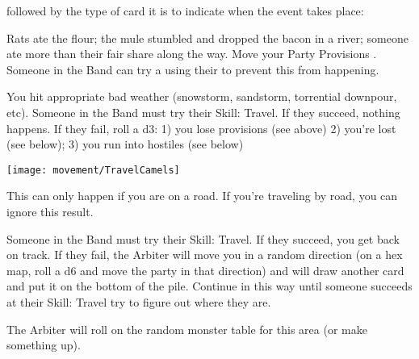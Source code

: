   followed by the type of card it is to indicate when the event takes place:





  Rats ate the flour; the mule stumbled and dropped the bacon in a river; someone ate more than their fair share along the way.  Move your Party Provisions \DCDOWN.  Someone in the Band can try a \RO using their  to prevent this from happening.


  You hit appropriate bad weather (snowstorm, sandstorm, torrential downpour, etc).  Someone in the Band must try their Skill: Travel.  If they succeed, nothing happens.  If they fail, roll a d3:  1) you lose provisions (see above) 2) you're lost (see below); 3) you run into hostiles (see below)


\begin{figure*}
\texttt{[image: movement/TravelCamels]}
\end{figure*}

\newpage 


  This can only happen if you are  on a road. If you're traveling by road, you can ignore this result.

  Someone in the Band must try their Skill: Travel.  If they succeed, you get back on track.  If they fail, the Arbiter will move you in a random direction (on a hex map, roll a d6 and move the party in that direction) and will draw another card and put it on the bottom of the pile. Continue in this way until someone succeeds at their Skill: Travel try to figure out where they are.



  The Arbiter will roll on the random monster table for this area (or make something up).

